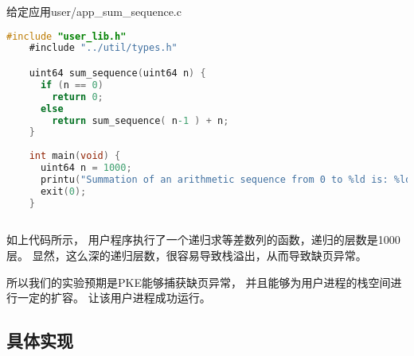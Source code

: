 给定应用user/app\_sum\_sequence.c

\begin{lstlisting}[caption={用户态应用app\_sum\_sequence.c}, label={lst:app_sum_sequence}, language=C]
    #include "user_lib.h"
    #include "../util/types.h"

    uint64 sum_sequence(uint64 n) {
      if (n == 0)
        return 0;
      else
        return sum_sequence( n-1 ) + n;
    }
    
    int main(void) {
      uint64 n = 1000;
      printu("Summation of an arithmetic sequence from 0 to %ld is: %ld \n", n, sum_sequence(n) );
      exit(0);
    }
        
\end{lstlisting}

如上代码所示，
用户程序执行了一个递归求等差数列的函数，递归的层数是1000层。
显然，这么深的递归层数，很容易导致栈溢出，从而导致缺页异常。

所以我们的实验预期是PKE能够捕获缺页异常，
并且能够为用户进程的栈空间进行一定的扩容。
让该用户进程成功运行。


\subsection{具体实现}

